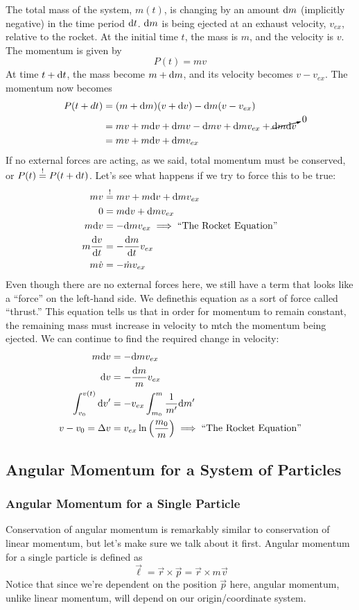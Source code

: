 \documentclass[a4paper]{article}
\begin{document}
The total mass of the system, $m(t)$, is changing by an amount $\mathrm{d} m$ 
(implicitly negative) in
the time period $\mathrm{d} t$. $\mathrm{d} m$ is being ejected at an exhaust velocity,
$v_{ex}$, relative to the rocket. At the initial time $t$, the mass is
$m$, and the velocity is $v$. The momentum is given by
\[ P(t) = mv \]
At time $t+\mathrm{d} t$, the mass become $m + \mathrm{d} m$, and its velocity becomes
$v-v_{ex}$. The momentum now becomes
\begin{align*}
    P(t+dt) &= (m+\mathrm{d} m)(v+\mathrm{d} v)-\mathrm{d} m(v-v_{ex})\\
    &= mv+m\mathrm{d} v+\mathrm{d} m v - \mathrm{d} m v + \mathrm{d} m v_{ex} + \cancelto{0}{\mathrm{d} m \mathrm{d} v}\\
    &=mv + m\mathrm{d} v + \mathrm{d} m v_{ex}
\end{align*}
If no external forces are acting, as we said, total momentum must be conserved,
or $P(t) \overset{!}{=} P(t+\mathrm{d} t)$. Let's see what happens if we try to force this to be
true:
\begin{align*}
    mv &\overset{!}{=} mv + m\mathrm{d} v + \mathrm{d} mv_{ex}\\
    0 &= m\mathrm{d} v + \mathrm{d} mv_{ex}\\
    m\mathrm{d} v &= -\mathrm{d} mv_{ex} \implies \text{``The Rocket Equation''}\\
    m\frac{\mathrm{d} v}{\mathrm{d} t} &= -\frac{\mathrm{d} m}{\mathrm{d} t}v_{ex}\\
    m\dot{v} &= -\dot{m}v_{ex}
\end{align*}
Even though there are no external forces here, we still have a term that looks
like a ``force'' on the left-hand side. We definethis equation as a sort of
force called ``thrust.'' This equation tells us that in order for momentum to
remain constant, the remaining mass must increase in velocity to mtch the
momentum being ejected. We can continue to find the required change in
velocity:
\begin{align*}
    m\mathrm{d} v &= -\mathrm{d} mv_{ex}\\
    \mathrm{d} v &= -\frac{\mathrm{d} m}{m}v_{ex}\\
    \int_{v_0}^{v(t)}\mathrm{d} v' &= -v_{ex}\int_{m_0}^{m}\frac{1}{m'}\mathrm{d} m'\\
    v-v_0 = \Delta v &= v_{ex}\ln\left(\frac{m_0}{m}\right) \implies \text{``The Rocket Equation''}
\end{align*}


\subsection{Angular Momentum for a System of Particles}
\subsubsection{Angular Momentum for a Single Particle}
Conservation of angular momentum is remarkably similar to conservation of linear
momentum, but let's make sure we talk about it first. Angular momentum for a
single particle is defined as
\[
    \vec{\ell} =   \vec{r}\times\vec{p}= \vec{r}\times m\vec{v}
\]
Notice that since we're dependent on the position $\vec{p}$ here, angular
momentum, unlike linear momentum, will depend on our origin/coordinate system.
\end{document}
